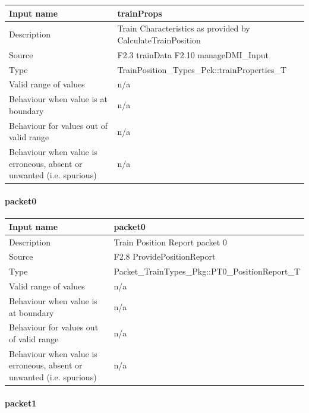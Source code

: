 \begin{longtable}{p{}p{}}
\toprule
Input name				& trainProps\\
\midrule
Description				& Train Characteristics as provided by CalculateTrainPosition  \\
\midrule
Source					& F2.3 trainData\newline
F2.10 manageDMI\_Input \\ 
\midrule
Type					& TrainPosition\_Types\_Pck::trainProperties\_T\\
\midrule
Valid range of values	& n/a \\
\midrule
Behaviour when value is at boundary	& n/a\\
\midrule
Behaviour for values out of valid range	& n/a\\
\midrule
Behaviour when value is erroneous, absent or unwanted (i.e. spurious) & n/a\\

\bottomrule


\end{longtable}

\paragraph{packet0}

\begin{longtable}{p{}p{}}
\toprule
Input name				& packet0\\
\midrule
Description				& Train Position Report packet 0  \\
\midrule
Source					& F2.8 ProvidePositionReport \\ 
\midrule
Type					& Packet\_TrainTypes\_Pkg::PT0\_PositionReport\_T\\
\midrule
Valid range of values	& n/a \\
\midrule
Behaviour when value is at boundary	& n/a\\
\midrule
Behaviour for values out of valid range	& n/a\\
\midrule
Behaviour when value is erroneous, absent or unwanted (i.e. spurious) & n/a\\

\bottomrule


\end{longtable}

\paragraph{packet1}

